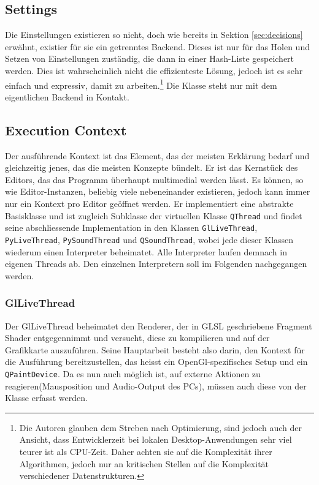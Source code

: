 \subsection{Settings}
    Die Einstellungen existieren so nicht, doch wie bereits in Sektion \ref{sec:decisions} erwähnt, existier für sie ein getrenntes Backend. Dieses ist nur für das Holen und Setzen
    von Einstellungen zuständig, die dann in einer Hash-Liste gespeichert werden. Dies ist wahrscheinlich nicht die effizienteste Lösung, jedoch ist es sehr einfach und expressiv, damit 
    zu arbeiten.\footnote{Die Autoren glauben dem Streben nach Optimierung, sind jedoch auch der Ansicht, dass Entwicklerzeit bei lokalen Desktop-Anwendungen sehr viel teurer ist als 
    CPU-Zeit. Daher achten sie auf die Komplexität ihrer Algorithmen, jedoch nur an kritischen Stellen auf die Komplexität verschiedener Datenstrukturen.} Die Klasse steht nur mit dem
    eigentlichen Backend in Kontakt.

\subsection{Execution Context}
    Der ausführende Kontext ist das Element, das der meisten Erklärung bedarf und gleichzeitig jenes, das die meisten Konzepte bündelt. Er ist das Kernstück des Editors, das das
    Programm überhaupt multimedial werden lässt. Es können, so wie Editor-Instanzen, beliebig viele nebeneinander existieren, jedoch kann immer nur ein Kontext pro Editor geöffnet
    werden. Er implementiert eine abstrakte Basisklasse und ist zugleich Subklasse der virtuellen Klasse \texttt{QThread} und findet seine abschliessende Implementation in den Klassen
    \texttt{GlLiveThread}, \texttt{PyLiveThread}, \texttt{PySoundThread} und \texttt{QSoundThread}, wobei jede dieser Klassen wiederum einen Interpreter beheimatet. Alle Interpreter
    laufen demnach in eigenen Threads ab. Den einzelnen Interpretern soll im Folgenden nachgegangen werden.

\subsubsection{GlLiveThread}
    Der GlLiveThread beheimatet den Renderer, der in GLSL geschriebene Fragment Shader entgegennimmt und versucht, diese zu kompilieren und auf der Grafikkarte auszuführen. Seine
    Hauptarbeit besteht also darin, den Kontext für die Ausführung bereitzustellen, das heisst ein OpenGl-spezifisches Setup und ein \texttt{QPaintDevice}. Da es nun auch möglich ist,
    auf externe Aktionen zu reagieren(Mausposition und Audio-Output des PCs), müssen auch diese von der Klasse erfasst werden.

